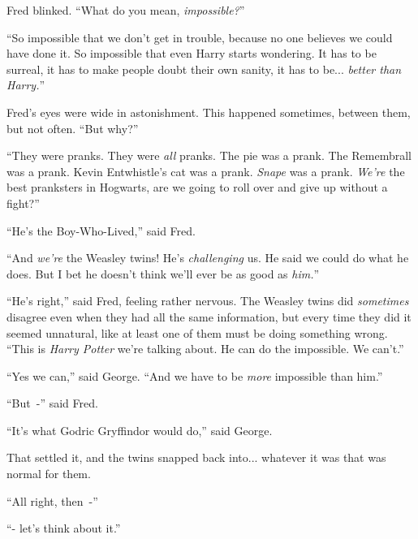 Fred blinked. ``What do you mean, \emph{impossible?}''

``So impossible that we don't get in trouble, because no one believes we could have done it. So impossible that even Harry starts wondering. It has to be surreal, it has to make people doubt their own sanity, it has to be... \emph{better than Harry.}''

Fred's eyes were wide in astonishment. This happened sometimes, between them, but not often. ``But why?''

``They were pranks. They were \emph{all} pranks. The pie was a prank. The Remembrall was a prank. Kevin Entwhistle's cat was a prank. \emph{Snape} was a prank. \emph{We're} the best pranksters in Hogwarts, are we going to roll over and give up without a fight?''

``He's the Boy-Who-Lived,'' said Fred.

``And \emph{we're} the Weasley twins! He's \emph{challenging} us. He said we could do what he does. But I bet he doesn't think we'll ever be as good as \emph{him.}''

``He's right,'' said Fred, feeling rather nervous. The Weasley twins did \emph{sometimes} disagree even when they had all the same information, but every time they did it seemed unnatural, like at least one of them must be doing something wrong. ``This is \emph{Harry Potter} we're talking about. He can do the impossible. We can't.''

``Yes we can,'' said George. ``And we have to be \emph{more} impossible than him.''

``But~-'' said Fred.

``It's what Godric Gryffindor would do,'' said George.

That settled it, and the twins snapped back into... whatever it was that was normal for them.

``All right, then~-''

``- let's think about it.''
